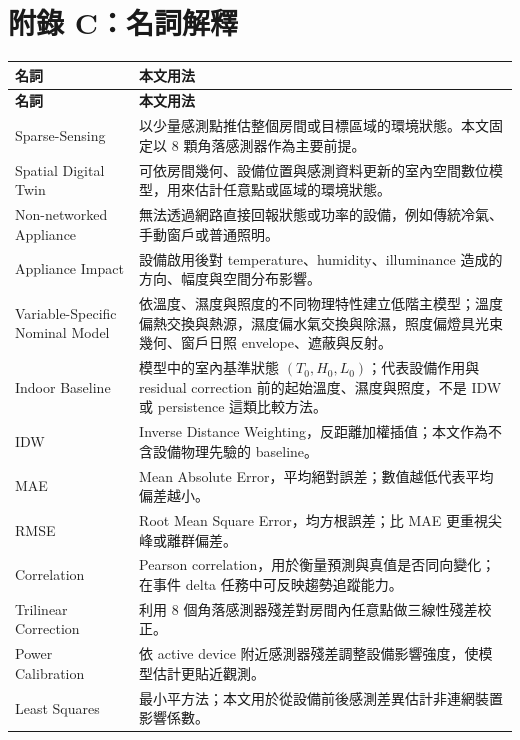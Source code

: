 \documentclass[12pt,a4paper]{article}
\begin{document}
\section*{附錄 C：名詞解釋}

{\footnotesize
\renewcommand{\arraystretch}{1.25}
\begin{longtable}{|>{\raggedright\arraybackslash}p{}|>{\raggedright\arraybackslash}p{}|}
\hline
\textbf{名詞} & \textbf{本文用法} \\
\hline
\endfirsthead
\hline
\textbf{名詞} & \textbf{本文用法} \\
\hline
\endhead
\hline
\endfoot
\hline
\endlastfoot
Sparse-Sensing & 以少量感測點推估整個房間或目標區域的環境狀態。本文固定以 8 顆角落感測器作為主要前提。 \\
\hline
Spatial Digital Twin & 可依房間幾何、設備位置與感測資料更新的室內空間數位模型，用來估計任意點或區域的環境狀態。 \\
\hline
Non-networked Appliance & 無法透過網路直接回報狀態或功率的設備，例如傳統冷氣、手動窗戶或普通照明。 \\
\hline
Appliance Impact & 設備啟用後對 temperature、humidity、illuminance 造成的方向、幅度與空間分布影響。 \\
\hline
Variable-Specific Nominal Model & 依溫度、濕度與照度的不同物理特性建立低階主模型；溫度偏熱交換與熱源，濕度偏水氣交換與除濕，照度偏燈具光束幾何、窗戶日照 envelope、遮蔽與反射。 \\
\hline
Indoor Baseline & 模型中的室內基準狀態 $(T_0,H_0,L_0)$；代表設備作用與 residual correction 前的起始溫度、濕度與照度，不是 IDW 或 persistence 這類比較方法。 \\
\hline
IDW & Inverse Distance Weighting，反距離加權插值；本文作為不含設備物理先驗的 baseline。 \\
\hline
MAE & Mean Absolute Error，平均絕對誤差；數值越低代表平均偏差越小。 \\
\hline
RMSE & Root Mean Square Error，均方根誤差；比 MAE 更重視尖峰或離群偏差。 \\
\hline
Correlation & Pearson correlation，用於衡量預測與真值是否同向變化；在事件 delta 任務中可反映趨勢追蹤能力。 \\
\hline
Trilinear Correction & 利用 8 個角落感測器殘差對房間內任意點做三線性殘差校正。 \\
\hline
Power Calibration & 依 active device 附近感測器殘差調整設備影響強度，使模型估計更貼近觀測。 \\
\hline
Least Squares & 最小平方法；本文用於從設備前後感測差異估計非連網裝置影響係數。 \\

\end{longtable}}
\end{document}
